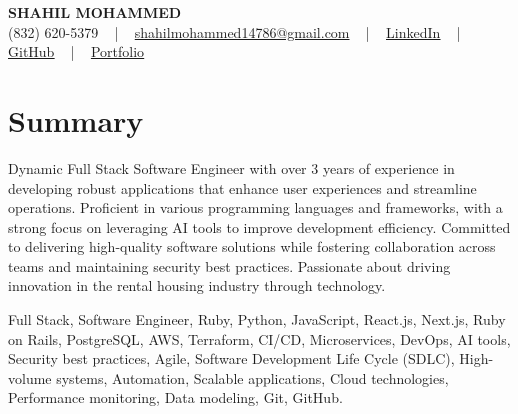 \documentclass[letterpaper,10pt]{article}
\begin{document}
\begin{center}
    {\fontsize{14pt}{12pt}\selectfont \textbf{\MakeUppercase{Shahil Mohammed}}}\\ \vspace{2pt}
    \fontsize{10pt}{12pt}\selectfont (832) 620-5379 ~ | ~ \href{mailto:shahilmohammed14786@gmail.com}{shahilmohammed14786@gmail.com} ~ | ~  
    \href{https://www.linkedin.com/in/shahil-mohammed-9652931a1/}{\color{blue}\underline{LinkedIn}}  ~ | ~ 
    \href{https://github.com/freakbeast14}{\color{blue}\underline{GitHub}} ~ | ~ 
    \href{https://shahil-mohammed.netlify.app/}{\color{blue}\underline{Portfolio}}
    \vspace{-8pt}
\end{center}

\section{Summary}
\vspace{-2pt}\fontsize{8pt}{9pt}\selectfont
Dynamic Full Stack Software Engineer with over 3 years of experience in developing robust applications that enhance user experiences and streamline operations. Proficient in various programming languages and frameworks, with a strong focus on leveraging AI tools to improve development efficiency. Committed to delivering high-quality software solutions while fostering collaboration across teams and maintaining security best practices. Passionate about driving innovation in the rental housing industry through technology.
 \vspace{-5pt}
 
{\fontsize{1pt}{1pt}\selectfont\color{white}
Full Stack, Software Engineer, Ruby, Python, JavaScript, React.js, Next.js, Ruby on Rails, PostgreSQL, AWS, Terraform, CI/CD, Microservices, DevOps, AI tools, Security best practices, Agile, Software Development Life Cycle (SDLC), High-volume systems, Automation, Scalable applications, Cloud technologies, Performance monitoring, Data modeling, Git, GitHub.
}
\vspace{-8pt}

\vspace{-2pt}
\end{document}
